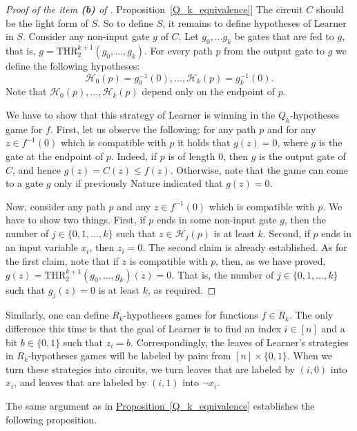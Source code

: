 \documentclass[11pt]{article}
\numberwithin{equation}{section}
\theoremstyle{definition}
\theoremstyle{plain}
\newcommand{\expref}[2]{\hyperref[#2]{#1~\ref{#2}}}
\def\THR{\mathrm{THR}}
\begin{document}
\begin{proof}[Proof of the item \textbf{(b)} of \expref{Proposition}{Q_k_equivalence}]
The circuit $C$ should be the light form of $S$. So to define $S$, it remains to define hypotheses of Learner in $S$. Consider any non-input gate $g$ of $C$. Let $g_0, \ldots g_k$ be gates that are fed to $g$, that is, $g = \THR^{k+1}_2(g_0, \ldots, g_k)$. For every path $p$ from the output gate to $g$ we define the following hypotheses:
\[
 \mathcal{H}_0(p) = g_0^{-1}(0), \ldots, \mathcal{H}_k(p) = g_k^{-1}(0).
\]
Note that $\mathcal{H}_0(p), \ldots, \mathcal{H}_k(p)$ depend only on the endpoint of $p$. 

We have to show that this strategy of Learner is winning in the $Q_k$-hypotheses game for $f$. First, let us observe the following: for any path $p$ and for any $z\in f^{-1}(0)$ which is compatible with $p$ it holds that $g(z) = 0$, where $g$ is the gate at the endpoint of $p$. Indeed, if $p$ is of length 0, then $g$ is the output gate of $C$, and hence $g(z) = C(z) \le f(z)$. Otherwise, note that the game can come to a gate $g$ only if previously Nature indicated that $g(z) = 0$.

Now, consider any path $p$ and any $z\in f^{-1}(0)$ which is compatible with $p$. We have to show two things. First, if $p$ ends in some non-input gate $g$, then the number of $j\in\{0, 1, \ldots, k\}$ such that $z\in \mathcal{H}_j(p)$ is at least $k$. Second, if $p$ ends in an input variable $x_i$, then $z_i = 0$. The second claim is already established. As for the first claim, note that if $z$ is compatible with $p$, then, as we have proved, $g(z) = \THR^{k+1}_2(g_0, \ldots, g_k)(z) = 0$. That is, the number of $j\in\{0, 1,\ldots,k\}$ such that $g_j(z) = 0$ is at least $k$, as required.
\end{proof}

Similarly, one can define $R_k$-hypotheses games for functions $f\in R_k$. The only difference this time is that the goal of Learner is to find an index $i\in[n]$ and a bit $b\in \{0,1\}$ such that $z_i = b$. Correspondingly,
%
the leaves %
of Learner's strategies in $R_k$-hypotheses games will be labeled by pairs from $[n]\times\{0,1\}$. When we turn these strategies into circuits, we
turn %
leaves  %
that are labeled by $(i, 0)$ into $x_i$, and %
leaves  %
that are labeled by $(i, 1)$ into $\lnot x_i$.

The same argument as in \expref{Proposition}{Q_k_equivalence} establishes the following proposition.
 
\end{document}
